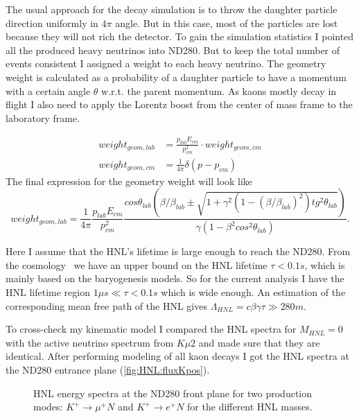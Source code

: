 \documentclass[../main.tex]{subfiles}
\begin{document}
The usual approach for the decay simulation is to throw the daughter particle direction uniformly in $4\pi$ angle. But in this case, most of the particles are lost because they will not rich the detector. To gain the simulation statistics I pointed all the produced heavy neutrinos into ND280. But to keep the total number of events consistent I assigned a weight to each heavy neutrino. The geometry weight is calculated as a probability of a daughter particle to have a momentum with a certain angle $\theta$ w.r.t. the parent momentum. As kaons mostly decay in flight I also need to apply the Lorentz boost from the center of mass frame to the laboratory frame.

\begin{align}
    weight_{geom, lab}&=\frac{p_{lab}E_{cm}}{p_{cm}^2}\cdot weight_{geom,cm}
    \nonumber \\
    weight_{geom, cm} &= \frac{1}{4\pi}\delta\left(p-p_{cm}\right)
\end{align}
The final expression for the geometry weight will look like
\begin{equation}
    weight_{geom, lab}=\frac{1}{4\pi}\frac{p_{lab}E_{cm}}{p_{cm}^2}\frac{cos\theta_{lab}\left(\beta/\beta_{lab}\pm\sqrt{1+\gamma^2\left(1-\left(\beta/\beta_{lab}\right)^2\right)tg^2\theta_{lab}}\right)}{\gamma\left(1-\beta^{2}cos^{2}\theta_{lab}\right)}.
    \label{eq:HNL:lorentz}
\end{equation}

Here I assume that the HNL's lifetime is large enough to reach the ND280. From the cosmology~\cite{Gorbunov2007} we have an upper bound on the HNL lifetime  $\tau < 0.1s$, which is mainly based on the baryogenesis models. So for the current analysis I have the HNL lifetime region $1\mu s\ll\tau<0.1s$ which is wide enough. An estimation of the corresponding mean free path of the HNL gives $\Lambda_{HNL}=c\beta\gamma\tau\gg280 m$.

To cross-check my kinematic model I compared the HNL spectra for $M_{HNL}=0$ with the active neutrino spectrum from $K\mu2$ and made sure that they are identical. After performing modeling of all kaon decays I got the HNL spectra at the ND280 entrance plane (\autoref{fig:HNL:fluxKpos}).

\begin{figure}[!ht]
    \begin{minipage}{0.49\linewidth}
    \end{minipage}
    \hfill
    \begin{minipage}{0.49\linewidth}
    \end{minipage}
    \caption{HNL energy spectra at the ND280 front plane for two production modes: $K^+\rightarrow \mu^+N$ and $K^+\rightarrow e^+N$ for the different HNL masses.}
    \label{fig:HNL:fluxKpos}
\end{figure}
\end{document}
